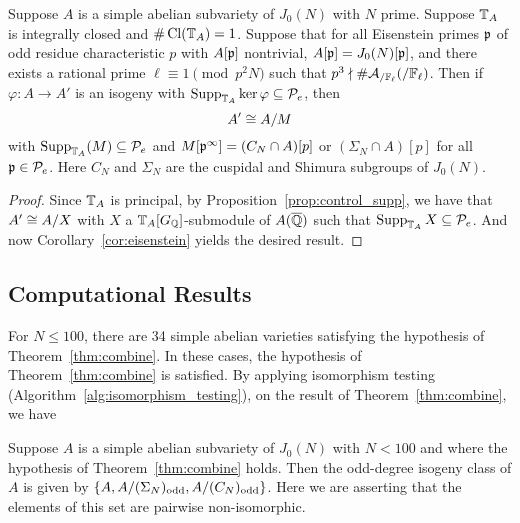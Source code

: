 \documentclass[thesis.tex]{subfiles}
\begin{document}
\begin{theorem}%
    \label{thm:combine}
    Suppose $A$ is a simple abelian subvariety of $J_0(N)$ with $N$ prime.
    Suppose $\mathbb{T}_A$ is integrally closed and $\#\operatorname{Cl}(\mathbb{T}_A)=1$. Suppose that for
    all Eisenstein primes $\mathfrak{p}$ of odd residue characteristic $p$ with $A[\mathfrak{p}]$
    nontrivial, $A[\mathfrak{p}]=J_0(N)[\mathfrak{p}]$, and there exists a rational prime
    $\ell\equiv 1\pmod{p^2N}$ such that $p^3\nmid
    \#\mathcal{A}_{/\mathbb{F}_\ell}(/\mathbb{F}_\ell)$. Then if $\varphi:A\to A'$ is an
    isogeny with $\operatorname{Supp}_{\mathbb{T}_A} \ker\varphi\subseteq \mathcal{P}_e$, then
    \[
        A'\cong A/M
    \]
    with $\operatorname{Supp}_{\mathbb{T}_A}(M)\subseteq \mathcal{P}_e$ and $M[\mathfrak{p}^\infty]=(C_N\cap A)[p]$ or
    $(\Sigma_N\cap A)[p]$ for all $\mathfrak{p}\in \mathcal{P}_e$. Here $C_N$ and $\Sigma_N$ are
    the cuspidal and Shimura subgroups of $J_0(N)$.
\end{theorem}
\begin{proof}
    Since $\mathbb{T}_A$ is principal, by Proposition~\ref{prop:control_supp}, we have
    that $A'\cong A/X$ with $X$ a $\mathbb{T}_A[G_{\mathbb{Q}}]$-submodule of $A(\overline{\mathbb{Q}})$ such
    that $\operatorname{Supp}_{\mathbb{T}_A}X\subseteq \mathcal{P}_e$. And now Corollary~\ref{cor:eisenstein}
    yields the desired result.
\end{proof}

\subsection{Computational Results}

For $N\leq 100$, there are 34 simple abelian varieties satisfying the
hypothesis of Theorem~\ref{thm:combine}. In these cases, the hypothesis of
Theorem~\ref{thm:combine} is satisfied. By applying isomorphism testing
(Algorithm~\ref{alg:isomorphism_testing}), on the result of
Theorem~\ref{thm:combine}, we have
\begin{corollary}
    Suppose $A$ is a simple abelian subvariety of $J_0(N)$ with $N<100$ and
    where the hypothesis of Theorem~\ref{thm:combine} holds. Then the
    odd-degree isogeny class of $A$ is given by $\{A, A/(\Sigma_N)_{\mathrm{odd}},
    A/(C_N)_{\mathrm{odd}}\}$. Here we are asserting that the elements of this set are
    pairwise non-isomorphic.
\end{corollary}


\end{document}
